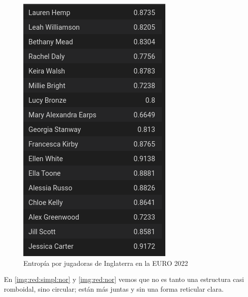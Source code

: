 \begin{figure}[h!tbp]
  \centering
   \includegraphics[width=\textwidth]{./img/entrop_engl.png}
   \caption{Entropía por jugadoras de Inglaterra en la EURO 2022}
   \label{img:red:eng}
\end{figure}

En \ref{img:red:simpl:nor} y \ref{img:red:nor} vemos que no es tanto una estructura casi romboidal, sino circular; 
están más juntas y sin una forma reticular clara.

